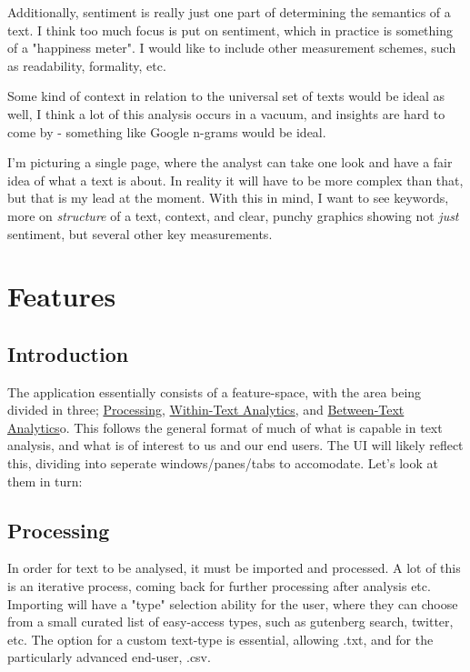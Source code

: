 \documentclass[11pt]{article}
\begin{document}
Additionally, sentiment is really just one part of determining the
semantics of a text. I think too much focus is put on sentiment, which
in practice is something of a "happiness meter". I would like to include
other measurement schemes, such as readability, formality, etc.

Some kind of context in relation to the universal set of texts would be
ideal as well, I think a lot of this analysis occurs in a vacuum, and
insights are hard to come by - something like Google n-grams would be
ideal.

I'm picturing a single page, where the analyst can take one look and
have a fair idea of what a text is about. In reality it will have to be
more complex than that, but that is my lead at the moment. With this in
mind, I want to see keywords, more on \emph{structure} of a text, context,
and clear, punchy graphics showing not \emph{just} sentiment, but several
other key measurements.

\section{Features}
\label{sec:org49cb9b1}
\subsection{Introduction}
\label{sec:org6011ea4}
The application essentially consists of a feature-space, with the area
being divided in three; \hyperref[sec:orga97ec2d]{Processing}, \hyperref[sec:org6f61dbb]{Within-Text Analytics}, and
\hyperref[sec:org7b04ca9]{Between-Text Analytics}o. This follows the general format of much of
what is capable in text analysis, and what is of interest to us and our
end users. The UI will likely reflect this, dividing into seperate
windows/panes/tabs to accomodate. Let's look at them in turn:

\subsection{Processing}
\label{sec:orga97ec2d}
In order for text to be analysed, it must be imported and processed. A
lot of this is an iterative process, coming back for further processing
after analysis etc. Importing will have a "type" selection ability for
the user, where they can choose from a small curated list of easy-access
types, such as gutenberg search, twitter, etc. The option for a custom
text-type is essential, allowing .txt, and for the particularly advanced
end-user, .csv.
\end{document}
